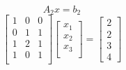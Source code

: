 \documentclass[unicode,11pt,a4paper,oneside,numbers=endperiod,openany]{scrartcl}
\begin{document}
\begin{itemize}
	\begin{equation}
	    A_2x = b_2
	\end{equation}
	\[
        \begin{bmatrix}
        1 & 0 & 0 \\
        0 & 1 & 1 \\
        1 & 2 & 1 \\
        1 & 0 & 1 \\
        \end{bmatrix}
        \begin{bmatrix}
        x_1 \\ x_2 \\ x_3 \\
        \end{bmatrix}
        =
        \begin{bmatrix}
        2 \\ 2 \\ 3 \\ 4
        \end{bmatrix}
    \]
    

\end{itemize}
\end{document}
